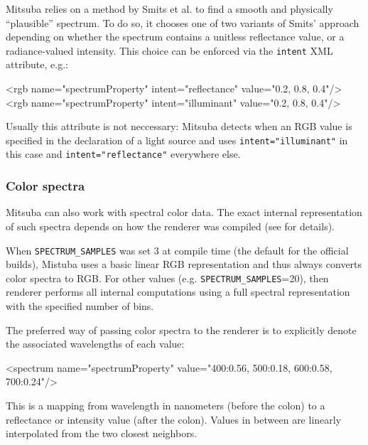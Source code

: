 Mitsuba relies on a method by Smits et al. \cite{Smits2005RGB} to find a
smooth and physically ``plausible'' spectrum. To do so, it chooses
one of two variants of Smits' approach depending on whether the spectrum contains a
unitless reflectance value, or a radiance-valued intensity. This choice can be
enforced via the \texttt{intent} XML attribute, e.g.:
\begin{xml}
<rgb name="spectrumProperty" intent="reflectance" value="0.2, 0.8, 0.4"/>
<rgb name="spectrumProperty" intent="illuminant" value="0.2, 0.8, 0.4"/>
\end{xml}
Usually this attribute is not neccessary:
Mitsuba detects when an RGB value is specified in the declaration of a light source
and uses \texttt{intent="illuminant"} in this case and \texttt{intent="reflectance"}
everywhere else.

\subsubsection{Color spectra}
\label{sec:format-spectra}
Mitsuba can also work with spectral color data. The exact internal representation of
such spectra depends on how the renderer was compiled (see  for
details).

When \texttt{SPECTRUM\_SAMPLES} was set 3 at compile time (the default for the official builds),
Mistuba uses a basic linear RGB representation and thus always converts color spectra to RGB.
For other values (e.g. \texttt{SPECTRUM\_SAMPLES}=20), then renderer performs all internal
computations using a full spectral representation with the specified number of bins.

The preferred way of passing color spectra to the renderer is to explicitly
denote the  associated wavelengths of each value:
\begin{xml}
<spectrum name="spectrumProperty" value="400:0.56, 500:0.18, 600:0.58, 700:0.24"/>
\end{xml}
This is a mapping from wavelength in nanometers (before the colon)
to a reflectance or intensity value (after the colon).
Values in between are linearly interpolated from the two closest neighbors.

